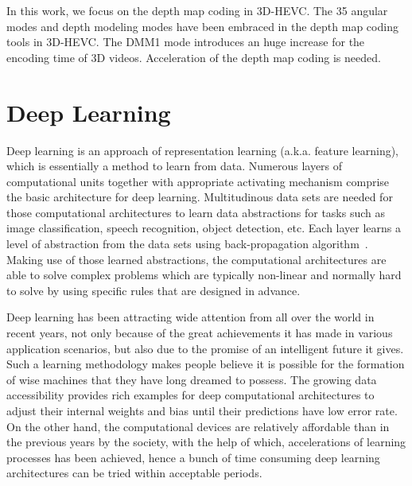 In this work, we focus on the depth map coding in 3D-HEVC\@.
The 35 angular modes and depth modeling modes have been embraced in the
depth map coding tools in 3D-HEVC\@.
The DMM1 mode introduces an huge increase for the encoding time of 3D videos.
Acceleration of the depth map coding is needed.

\section{Deep Learning}\label{sec:deep-learning}
Deep learning is an approach of representation learning
(a.k.a. feature learning), which is essentially a method to
learn from data.
Numerous layers of computational units together with appropriate activating
mechanism comprise the basic architecture for deep learning.
Multitudinous data sets are needed for those computational architectures
to learn data abstractions for tasks such as image classification,
speech recognition, object detection, etc.
Each layer learns a level of abstraction from the data sets using
back-propagation algorithm~\parencite{RN204}.
Making use of those learned abstractions, the computational architectures are
able to solve complex problems which are typically non-linear and normally hard
to solve by using specific rules that are designed in advance.

Deep learning has been attracting wide attention from all over the world
in recent years, not only because of the great achievements it has
made in various application scenarios, but also due to the promise of an
intelligent future it gives.
Such a learning methodology makes people believe it is possible
for the formation of wise machines
that they have long dreamed to possess.
The growing data accessibility provides rich examples for deep computational
architectures to adjust their internal weights and bias until their
predictions have low error rate.
On the other hand, the computational devices are relatively
affordable than in the previous years by the society, with the help of which,
accelerations of learning processes has been achieved, hence a bunch of
time consuming deep learning architectures can be tried within acceptable
periods.

